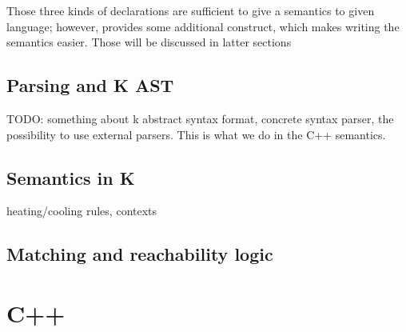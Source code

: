 \documentclass{fithesis3}
\begin{document}







Those three kinds of \K declarations are sufficient to give a semantics to given language; however, \K provides some additional construct, which makes writing the semantics easier. Those will be discussed in latter sections


\subsection{Parsing and K AST}
TODO: something about k abstract syntax format, concrete syntax parser, the possibility to use external parsers. This is what we do in the C++ semantics.

\subsection{Semantics in K}

heating/cooling rules, contexts

\subsection{Matching and reachability logic}


\section{C++}

\end{document}
